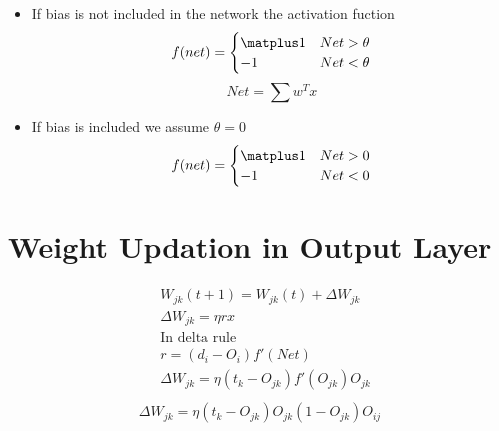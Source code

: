 \begin{itemize}
\begin{figure}[ht!]
\end{figure}

\item If bias is not included in the network the activation fuction 
\[
f(net) = \begin{cases}
          \matplus1 & Net > \theta \\
          -1        & Net < \theta
          \end{cases}
\]
\[
Net = \sum w^Tx
\]
\item If bias is included we assume $\theta = 0$
\[
f(net) = \begin{cases}
          	\matplus1 & Net > 0 \\
          	-1 		  & Net < 0
          \end{cases}
\]
\end{itemize}

\section{Weight Updation in Output Layer}
\begin{align*}
& W_{jk}(t+1) = W_{jk}(t) + \Delta W_{jk}  \\ 
& \Delta W_{jk} = \eta r x  \\
& \text{In delta rule}  \\
& r = (d_i - O_i) f'(Net)  \\
& \Delta W_{jk}= \eta (t_k - O_{jk}) f' (O_{jk})O_{jk}  \\
\end{align*}
\begin{align}
\Delta W_{jk} = \eta (t_k - O_{jk}) O_{jk}(1-O_{jk})O_{ij}
\end{align}

